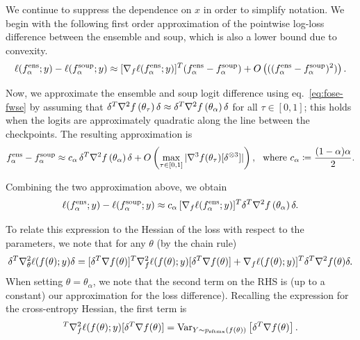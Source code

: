 We continue to suppress the dependence on $x$ in order to simplify notation.
We begin with the following first order approximation of the pointwise log-loss difference between the ensemble and soup, which is also a lower bound due to convexity. 
\begin{equation*}
	\ell(f_\alpha^{\mathrm{ens}};y) - \ell(f_\alpha^{\mathrm{soup}};y)
	\approx
	[\nabla_f \ell (f_\alpha^{\mathrm{ens}}; y)]^T (f_\alpha^{\mathrm{ens}} - f_\alpha^{\mathrm{soup}}) + O\left( ( (f_\alpha^{\mathrm{ens}} - f_\alpha^{\mathrm{soup}})^2 ) \right).
\end{equation*}

Now, we approximate the ensemble and soup logit difference using eq.~\ref{eq:fose-fwse} by assuming that $\delta^{T}\nabla^{2} f\left(\theta_{\tau}\right)\delta \approx \delta^{T}\nabla^{2} f\left(\theta_{\alpha}\right)\delta$ for all $\tau\in[0,1]$; this holds when the logits are approximately quadratic along the line between the checkpoints. The resulting approximation is
\begin{equation*}
	f_\alpha^{\mathrm{ens}} - f_\alpha^{\mathrm{soup}} \approx c_\alpha\, \delta^{T}\nabla^{2} f\left(\theta_{\alpha}\right)\delta
	+
	O\left( \max_{\tau\in[0,1]} | \nabla^3 f(\theta_\tau)[\delta^{\otimes 3}] | \right)
	,~~\mbox{where}~c_\alpha \coloneqq \frac{(1-\alpha)\alpha}{2}.
\end{equation*}

Combining the two approximation above, we obtain
\begin{equation*}
	\ell(f_\alpha^{\mathrm{ens}};y) - \ell(f_\alpha^{\mathrm{soup}};y) \approx c_\alpha\, [\nabla_f \ell (f_\alpha^{\mathrm{ens}}; y)]^T \delta^{T}\nabla^{2} f\left(\theta_{\alpha}\right)\delta.
\end{equation*}

To relate this expression to the Hessian of the loss with respect to the parameters, we note that for any $\theta$ (by the chain rule)
\begin{equation*}
	\delta^T  \nabla^{2}_\theta \ell( f(\theta); y) \delta 
	=
	[\delta^T \nabla f(\theta)]^T \nabla^{2}_f \ell(f(\theta);y) [\delta^T \nabla f(\theta)]
	+
	\nabla_f \ell (f(\theta); y)]^T \delta^{T}\nabla^{2} f(\theta)\delta.
\end{equation*} 
When setting $\theta=\theta_\alpha$, we note that the second term on the RHS is (up to a constant) our approximation for the loss difference). Recalling the expression for the cross-entropy Hessian, the first term is
\begin{equation*}
	[\delta^T \grad f(\theta)]^T \hess_f \ell(f(\theta);y) [\delta^T \grad f(\theta)]
	=
	\mathrm{Var}_{Y\sim \softmax(f(\theta))} \left[ \delta^T \grad f(\theta) \right].
\end{equation*}

